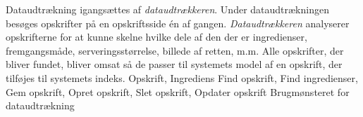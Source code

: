 {Dataudtrækning igangsættes af \textit{dataudtrækkeren}. Under dataudtrækningen besøges opskrifter på en opskriftsside én af gangen. \textit{Dataudtrækkeren} analyserer opskrifterne for at kunne skelne hvilke dele af den der er ingredienser, fremgangsmåde, serveringsstørrelse, billede af retten, m.m. Alle opskrifter, der bliver fundet, bliver omsat så de passer til systemets model af en opskrift, der tilføjes til systemets indeks.}
{Opskrift, Ingrediens}
{Find opskrift, Find ingredienser, Gem opskrift, Opret opskrift, Slet opskrift, Opdater opskrift}
{Brugmønsteret for dataudtrækning}
